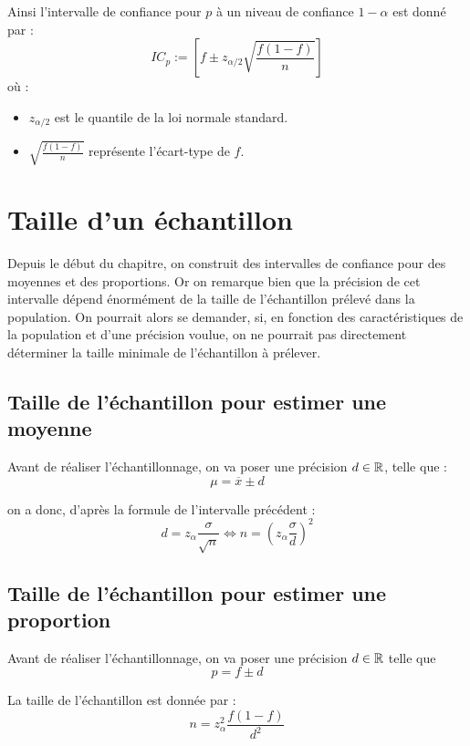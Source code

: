 Ainsi l'intervalle de confiance pour $p$ à un niveau de confiance $1 - \alpha$ est donné par :
    \[ \boxed{IC_p := \left[ f \pm z_{\alpha/2} \sqrt{\frac{f(1-f)}{n}}\right]} \] 
où : 
\begin{itemize}
    \item $z_{\alpha/2}$ est le quantile de la loi normale standard. 
    \item $\sqrt{\frac{f(1-f)}{n}} $ représente l'écart-type de $f$. 
\end{itemize}


\section{Taille d'un échantillon}

Depuis le début du chapitre, on construit des intervalles de confiance pour des moyennes et des proportions. 
Or on remarque bien que la précision de cet intervalle dépend énormément de la taille de l'échantillon prélevé 
dans la population. 
On pourrait alors se demander, si, en fonction des caractéristiques de la population et d'une précision voulue, 
on ne pourrait pas directement déterminer la taille minimale de l'échantillon à prélever. 

\subsection{Taille de l'échantillon pour estimer une moyenne}

Avant de réaliser l'échantillonnage, on va poser une précision $d \in \mathbb{R}$, telle que :
    \[ \mu = \overline{x} \pm d \] 

on a donc, d'après la formule de l'intervalle précédent : 
    \[ \boxed{ d = z_\alpha \frac{\sigma}{\sqrt{n}} \iff n = \left(z_\alpha \frac{\sigma}{d}\right)^2 } \] 


\subsection{Taille de l'échantillon pour estimer une proportion}

Avant de réaliser l'échantillonnage, on va poser une précision $d \in \mathbb{R}$ telle que 
    \[ p = f \pm d \] 

La taille de l'échantillon est donnée par : 
    \[ \boxed{n = z_\alpha^2 \frac{f(1-f)}{d^2}} \] 
